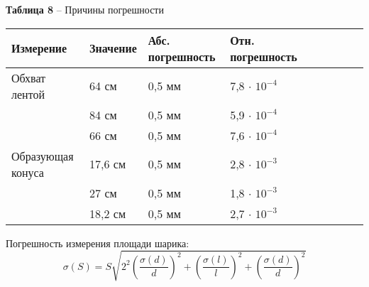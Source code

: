 \documentclass[12pt,a4paper]{article}
\begin{document}
            
            \begin{table}[!h]
            \begin{flushleft}
                \hspace{10}\textbf{Таблица 8} -- Причины погрешности \\
                \end{flushleft}
                    \begin{center}
                        \begin{tabular}{ | l | l | l | l | l | l | l | l | l |}
                        \hline
                        Измерение           &   Значение    &   Абс. погрешность    &   Отн. погрешность   \\
                        \hline
                        Обхват лентой       &   64 см       &   0,5 мм              &   7,8 $\cdot$ $10^{-4}$\\
                        \hline
                                            &   84 см       &   0,5 мм              &   5,9 $\cdot$ $10^{-4}$\\
                        \hline
                                            &   66 см       &   0,5 мм              &   7,6 $\cdot$ $10^{-4}$\\
                        \hline
                        Образующая конуса   &   17,6 см     &   0,5 мм              &   2,8 $\cdot$ $10^{-3}$\\
                        \hline
                                            &   27 см       &   0,5 мм              &   1,8 $\cdot$ $10^{-3}$\\
                        \hline
                                            &   18,2 см     &   0,5 мм              &   2,7 $\cdot$ $10^{-3}$\\
                        \hline
                        \end{tabular}
                    \end{center}
                \end{table}  
                
            Погрешность измерения площади шарика:
            \[
            \sigma(S) = S \sqrt{2^2(\frac{\sigma(d)}{d})^2 + (\frac{\sigma(l)}{l})^2 + (\frac{\sigma(d)}{d})^2}
            \]
            
\end{document}
